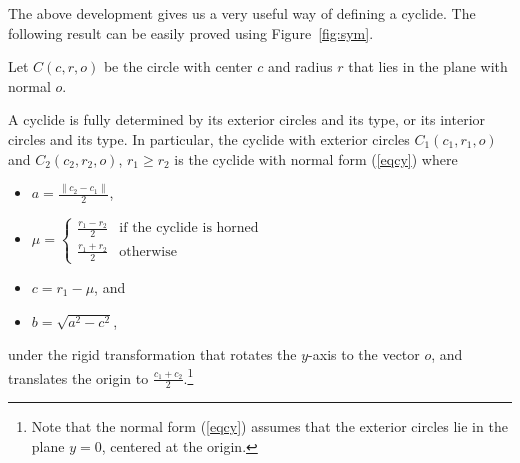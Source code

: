 The above development gives us a very useful way of defining a cyclide.
The following result can be easily proved using Figure~\ref{fig:sym}.

\begin{notation}
Let $C(c,r,o)$ be the circle with center $c$ and radius $r$
that lies in the plane with normal $o$.
\end{notation}

\begin{lemma}
\label{lem:uni}
A cyclide is fully determined by its exterior circles and its type,
or its interior circles and its type.
In particular, the cyclide with exterior circles $C_1(c_1,r_1,o)$
and $C_2(c_2,r_2,o)$, $r_1 \geq r_2$
is the cyclide with normal form (\ref{eqcy}) where
\begin{itemize}
\item
	$a = \frac{\|c_2 - c_1\|}{2}$, 
\item
	$\mu = \left\{ \begin{array}{ll}
		\frac{r_1 - r_2}{2} &	\mbox{if the cyclide is horned} \\
		\frac{r_1 + r_2}{2} &	\mbox{otherwise}
	\end{array}
	\right. $
\item
	$c = r_1 - \mu$, and 
\item
	$b = \sqrt{a^2 - c^2}$,
\end{itemize}
under the rigid transformation
that rotates the $y$-axis to the
vector $o$, and translates the origin to $\frac{c_1 + c_2}{2}$.\footnote{Note 
	that the normal form 
	(\ref{eqcy}) assumes that the exterior circles
	lie in the plane $y=0$, centered at the origin.}


\end{lemma}
